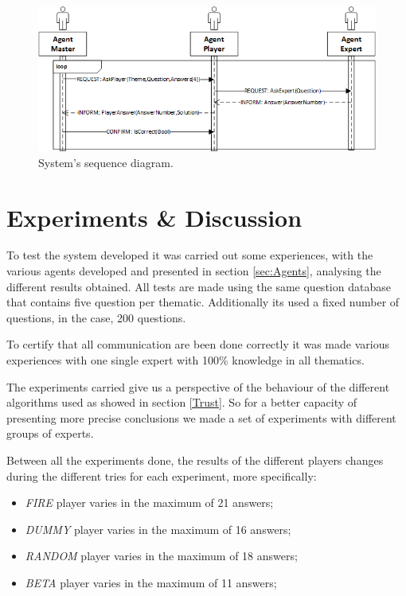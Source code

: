 \documentclass{llncs}
\begin{document}
\begin{figure}
	\centering
    \includegraphics[width=1\textwidth]{sequence.png}
    \caption{System's sequence diagram.}
    \label{sequence}
\end{figure}


\section{Experiments \& Discussion}\label{sec:Experiments}

To test the system developed it was carried out some experiences, with the various agents developed and presented in section \ref{sec:Agents}, analysing the different results obtained. All tests are made using the same question database that contains five question per thematic. Additionally its used a fixed number of questions, in the case, 200 questions.

To certify that all communication are been done correctly it was made various experiences with one single expert with 100\% knowledge in all thematics.

The experiments carried give us a perspective of the behaviour of the different algorithms used as showed in section \ref{Trust}. So for a better capacity of presenting more precise conclusions we made a set of experiments with different groups of experts.

Between all the experiments done, the results of the different players changes during the different tries for each experiment, more specifically:
\begin{itemize}
\item \textit{FIRE} player varies in the maximum of 21 answers;
\item \textit{DUMMY} player varies in the maximum of 16 answers;
\item \textit{RANDOM} player varies in the maximum of 18 answers;
\item \textit{BETA} player varies in the maximum of 11 answers;

\end{itemize}
\end{document}
